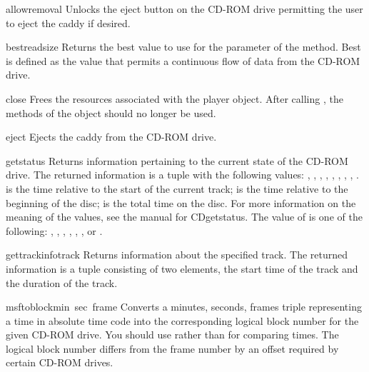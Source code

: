 \renewcommand{\indexsubitem}{(CD player object method)}
\begin{funcdesc}{allowremoval}{}
Unlocks the eject button on the CD-ROM drive permitting the user to
eject the caddy if desired.
\end{funcdesc}

\begin{funcdesc}{bestreadsize}{}
Returns the best value to use for the  parameter of
the  method.  Best is defined as the value that permits a
continuous flow of data from the CD-ROM drive.
\end{funcdesc}

\begin{funcdesc}{close}{}
Frees the resources associated with the player object.  After calling
, the methods of the object should no longer be used.
\end{funcdesc}

\begin{funcdesc}{eject}{}
Ejects the caddy from the CD-ROM drive.
\end{funcdesc}

\begin{funcdesc}{getstatus}{}
Returns information pertaining to the current state of the CD-ROM
drive.  The returned information is a tuple with the following values:
, , , , ,
, , , .
 is the time relative to the start of the current track;
 is the time relative to the beginning of the disc;
 is the total time on the disc.  For more information on
the meaning of the values, see the manual for CDgetstatus.
The value of  is one of the following: ,
, , ,
, , or .
\end{funcdesc}

\begin{funcdesc}{gettrackinfo}{track}
Returns information about the specified track.  The returned
information is a tuple consisting of two elements, the start time of
the track and the duration of the track.
\end{funcdesc}

\begin{funcdesc}{msftoblock}{min\, sec\, frame}
Converts a minutes, seconds, frames triple representing a time in
absolute time code into the corresponding logical block number for the
given CD-ROM drive.  You should use  rather than
 for comparing times.  The logical block number
differs from the frame number by an offset required by certain CD-ROM
drives.
\end{funcdesc}


